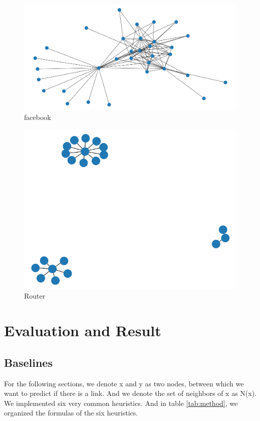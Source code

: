 \documentclass[12pt]{article}
\begin{document}
\begin{figure}[h]
	\centering
	\includegraphics[scale=0.3]{Facebook}
	\caption{facebook}
	\label{fig:facebook}
\end{figure}

\begin{figure}[h]
	\centering
	\includegraphics[scale=0.3]{Router}
	\caption{Router}
	\label{fig:Router}
\end{figure}
\section{Evaluation and Result}

\subsection{Baselines}
For the following sections, we denote x and y as two nodes, between which we want to predict if there is a link. And we denote the set of neighbors of x as N(x). We implemented six very common heuristics. And in table \ref{tab:method}, we organized the formulas of the six heuristics. \\
\end{document}
